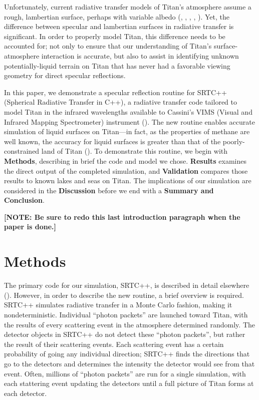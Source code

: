 \documentclass{article}
\begin{document}
Unfortunately, current radiative transfer models of Titan's atmosphere assume a rough, lambertian surface, perhaps with variable albedo (\cite{Griffith2012}, \cite{Xu2013}, \cite{Corlies2021}, \cite{Rannou2021}, \cite{EsSayeh2023}). Yet, the difference between specular and lambertian surfaces in radiative transfer is significant. In order to properly model Titan, this difference needs to be accounted for; not only to ensure that our understanding of Titan's surface-atmosphere interaction is accurate, but also to assist in identifying unknown potentially-liquid terrain on Titan that has never had a favorable viewing geometry for direct specular reflections. 

In this paper, we demonstrate a specular reflection routine for SRTC++ (Spherical Radiative Transfer in C++), a radiative transfer code tailored to model Titan in the infrared wavelengths available to Cassini's VIMS (Visual and Infrared Mapping Spectrometer) instrument (\cite{Barnes2018}). The new routine enables accurate simulation of liquid surfaces on Titan---in fact, as the properties of methane are well known, the accuracy for liquid surfaces is greater than that of the poorly-constrained land of Titan (\cite{Trainer2018}). To demonstrate this routine, we begin with \textbf{Methods}, describing in brief the code and model we chose. \textbf{Results} examines the direct output of the completed simulation, and \textbf{Validation} compares those results to known lakes and seas on Titan. The implications of our simulation are considered in the \textbf{Discussion} before we end with a \textbf{Summary and Conclusion}.

\textbf{\color{red} [NOTE: Be sure to redo this last introduction paragraph when the paper is done.] \color{black}}

\section{Methods}
The primary code for our simulation, SRTC++, is described in detail elsewhere (\cite{Barnes2018}). However, in order to describe the new routine, a brief overview is required. SRTC++ simulates radiative transfer in a Monte Carlo fashion, making it nondeterministic. Individual ``photon packets'' are launched toward Titan, with the results of every scattering event in the atmosphere determined randomly. The detector objects in SRTC++ do not detect these ``photon packets'', but rather the result of their scattering events. Each scattering event has a certain probability of going any individual direction; SRTC++ finds the directions that go to the detectors and determines the intensity the detector would see from that event. Often, millions of ``photon packets'' are run for a single simulation, with each stattering event updating the detectors until a full picture of Titan forms at each detector.
\end{document}
